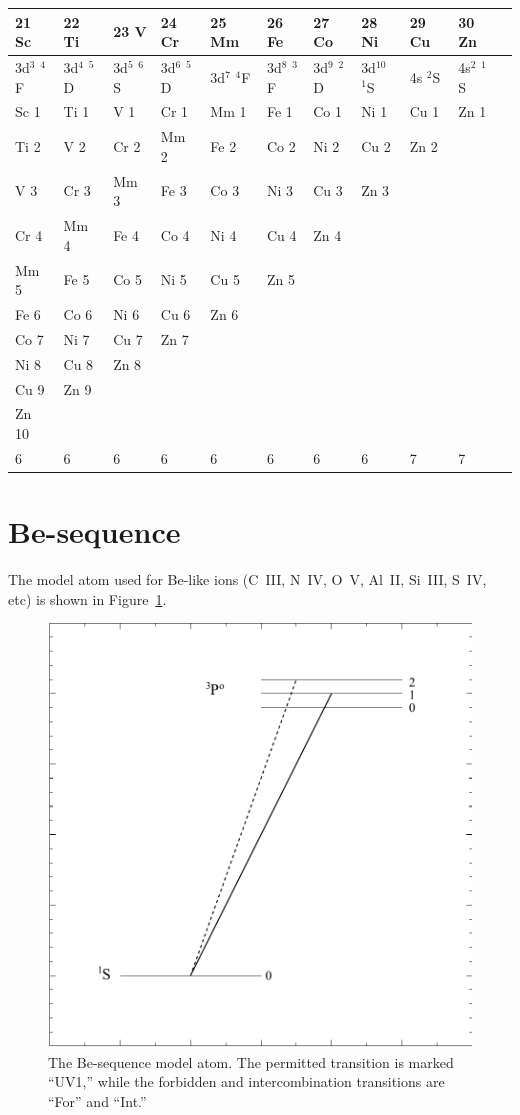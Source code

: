 \begin{tabular}{lllllllllll}
\hline
21 Sc&  22 Ti&  23 V&   24 Cr&  25 Mm&  26 Fe&  27 Co&  28 Ni&  29 Cu& 30
Zn\\
\hline
3d$^3$ $^4$F& 3d$^4$
$^5$D& 3d$^5$ $^6$S& 3d$^6$ $^5$D& 3d$^7$ $^4$F& 3d$^8$ $^3$F& 3d$^9$ $^2$D&
3d$^{10}$ $^1$S& 4s $^2$S& 4s$^2$ $^1$S\\
Sc 1& Ti 1& V  1& Cr 1& Mm 1& Fe
1& Co 1& Ni 1& Cu 1& Zn 1\\
Ti 2& V 2& Cr 2& Mm 2& Fe 2& Co 2& Ni 2& Cu 2& Zn 2\\
V  3& Cr 3& Mm 3& Fe 3& Co
3& Ni 3& Cu 3& Zn 3\\
Cr 4& Mm 4& Fe 4& Co 4& Ni 4& Cu 4& Zn 4\\
Mm 5& Fe 5& Co 5& Ni 5& Cu 5& Zn 5\\
Fe 6& Co
6& Ni 6& Cu 6& Zn 6\\
Co 7& Ni 7& Cu 7& Zn 7\\
Ni 8& Cu 8& Zn 8\\
Cu 9& Zn 9\\
Zn 10\\
6&6&6&6&6&6&6&6&7&7\\
\hline
\end{tabular}

\section{Be-sequence}

The model atom used for Be-like ions (C~III, N~IV, O~V, Al~II, Si~III, S~IV,
etc) is shown in Figure~\ref{fig:BeSequenceEnergyLevels}.

\begin{figure}
\centering
\includegraphics[scale=0.6]{BeSequenceEnergyLevels}
\caption[Be-sequence model atom]{The Be-sequence model atom.  The permitted transition is marked
``UV1,'' while the forbidden and intercombination transitions are ``For''
and ``Int.''}
\label{fig:BeSequenceEnergyLevels}
\end{figure}

